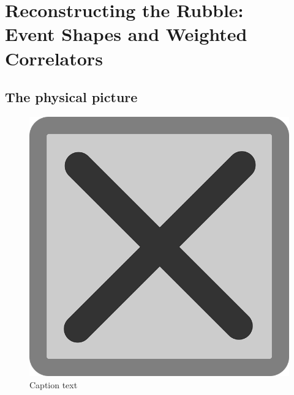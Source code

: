 \chapter{Reconstructing the Rubble:\\Event Shapes and Weighted Correlators}

\section{The physical picture}

\begin{figure}[t!]
    \centering
    \includegraphics[width=\textwidth]{figures/tempfig}

    \caption{
        Caption text
    }

    \label{fig:label}
\end{figure}

